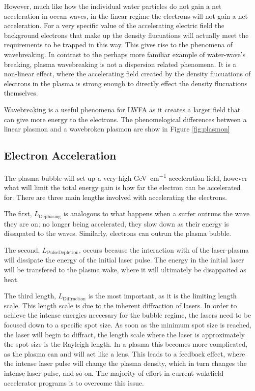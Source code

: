 \documentclass[12pt,letter]{article}
\begin{document}
However, much like how the individual water particles do not gain a net
acceleration in ocean waves, in the linear regime the electrons will not gain a
net acceleration.
    For a very specific value of the accelerating electric field the background
    electrons that make up the density flucuations will actually meet the
    requirements to be trapped in this way. This gives rise to the phenomena of
    wavebreaking. In contrast to the perhaps more familiar example of water-wave's
    breaking, plasma wavebreaking is not a dispersion related phenomena. It is a
    non-linear effect, where the accelerating field created by the density
    flucuations of electrons in the plasma is strong enough to directly effect the
    density flucuations themselves.

    Wavebreaking is a useful phenomena for LWFA as it creates a larger field that
    can give more energy to the electrons. The phenomelogical differences between a
    linear plasmon and a wavebroken plasmon are show in Figure \ref{fig:plasmon}

    \subsection{Electron Acceleration}
    The plasma bubble will set up a very high \si{\giga \electronvolt \per
    \centi \meter} acceleration field, however what will limit the total energy
    gain is how far the electron can be accelerated for. 
    There are three main lengths involved with accelerating the
    electrons.
    
    The first, $L_\mathrm{Dephasing}$ is analogous to what happens
    when a surfer outruns the wave they are on; no longer being accelerated,
    they slow down as their energy is dissapated to the waves. Similarly, electrons
    can outrun the plasma bubble. 

    The second, $L_\mathrm{Pulse Depletion}$, occurs because the interaction
    with of the laser-plasma will dissipate the energy of the initial laser
    pulse. The energy in the initial laser will be transfered to the plasma
    wake, where it will ultimately be disappaited as heat. 

    The third length, $L_\mathrm{Diffraction}$ is the most important, as it is
    the limiting length scale. This length scale is due to the inherent
    diffraction of lasers. In order to achieve the intense energies neccesary
    for the bubble regime, the lasers need to be focused down to a specific spot
    size. As soon as the minimum spot size is reached, the laser will begin to
    diffract, the length scale where the laser is approximately the spot size is
    the Rayleigh length. In a plasma this becomes more complicated, as the
    plasma can and will act like a lens. This leads to a feedback effect, where
    the intense laser pulse will change the plasma density, which in turn
    changes the intense laser pulse, and so on. The majority of effort in current wakefield accelerator  programs is to overcome this issue.
\end{document}

